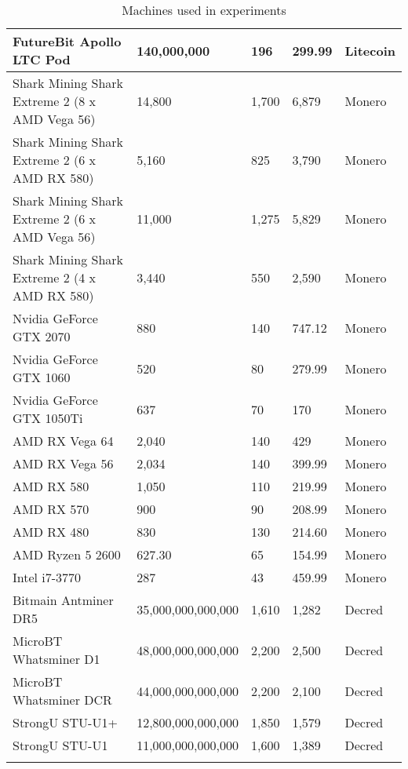 \begin{longtable}{|p{}|p{}|p{}|p{}|p{}|}
  FutureBit Apollo LTC Pod & 140,000,000 & 196 & 299.99 & Litecoin \\
  \hline
  Shark Mining Shark Extreme 2 (8 x AMD Vega 56) & 14,800 & 1,700 & 6,879 & Monero \\
  Shark Mining Shark Extreme 2 (6 x AMD RX 580) & 5,160 & 825 & 3,790 & Monero \\
  Shark Mining Shark Extreme 2 (6 x AMD Vega 56) & 11,000 & 1,275 & 5,829 & Monero \\
  Shark Mining Shark Extreme 2 (4 x AMD RX 580) & 3,440 & 550 & 2,590 & Monero \\
  Nvidia GeForce GTX 2070 & 880 & 140 & 747.12 & Monero \\
  Nvidia GeForce GTX 1060 & 520 & 80 & 279.99 & Monero \\
  Nvidia GeForce GTX 1050Ti & 637 & 70 & 170 & Monero \\
  AMD RX Vega 64 & 2,040 & 140 & 429 & Monero \\
  AMD RX Vega 56 & 2,034 & 140 & 399.99 & Monero \\
  AMD RX 580 & 1,050 & 110 & 219.99 & Monero \\
  AMD RX 570 & 900 & 90 & 208.99 & Monero \\
  AMD RX 480 & 830 & 130 & 214.60 & Monero \\
  AMD Ryzen 5 2600 & 627.30 & 65 & 154.99 & Monero \\
  Intel i7-3770 & 287 & 43 & 459.99 & Monero \\
  \hline
  Bitmain Antminer DR5 & 35,000,000,000,000 & 1,610 & 1,282 & Decred \\
  MicroBT Whatsminer D1 & 48,000,000,000,000 & 2,200 & 2,500 & Decred \\
  MicroBT Whatsminer DCR & 44,000,000,000,000 & 2,200 & 2,100 & Decred \\
  StrongU STU-U1+ & 12,800,000,000,000 & 1,850 & 1,579 & Decred \\
  StrongU STU-U1 & 11,000,000,000,000 & 1,600 & 1,389 & Decred \\
  \hline
\caption{Machines used in experiments}
\label{tbl:machines}
\end{longtable}
